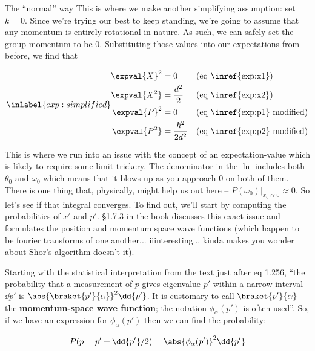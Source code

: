 \begin{answer}
\begin{answerpart}{The ``normal'' way}
    This is where we make another simplifying assumption: set $k = 0$.
    Since we're trying our best to keep \icepick{} standing, we're
    going to assume that any momentum is entirely rotational in
    nature.  As such, we can safely set the group momentum to be 0.
    Substituting those values into our expectations from before, we
    find that

    \begin{equation}
      \inlabel{exp:simplified}
      \begin{alignedat}{2}
        \expval{X}^2 &= 0 & \quad{} &\text{(eq \inref{exp:x1})}\\
        \expval{X^2} &= \frac{d^2}{2} & &\text{(eq \inref{exp:x2})}\\
        \expval{P}^2 &= 0 & &\text{(eq \inref{exp:p1} modified)}\\
        \expval{P^2} &= \frac{\hbar^2}{2d^2} & &\text{(eq \inref{exp:p2} modified)}\\
      \end{alignedat}
    \end{equation}
    
    This is where we run into an issue with the concept of an
    expectation-value which is likely to require some limit trickery.
    The denominator in the $\ln$ includes both $\theta_0$ and
    $\omega_0$ which means that it blows up as you approach 0 on both
    of them.  There is one thing that, physically, might help us out
    here -- $P(\omega_0)|_{x_0 \approx 0} \approx 0$.  So let's see if
    that integral converges.  To find out, we'll start by computing
    the probabilities of $x'$ and $p'$.  \S 1.7.3 in the book
    discusses this exact issue and formulates the position and
    momentum space wave functions (which happen to be fourier
    transforms of one another... iiinteresting... kinda makes you
    wonder about Shor's algorithm doesn't it).

    Starting with the statistical interpretation from the text just
    after eq 1.256, ``the probability that a measurement of $p$ gives
    eigenvalue $p'$ within a narrow interval $\dd{p'}$ is
    $\abs{\braket{p'}{\alpha}}^2\dd{p'}$.  It is customary to call
    $\braket{p'}{\alpha}$ the \textbf{momentum-space wave function};
    the notation $\phi_{\alpha}(p')$ is often used''.  So, if we have
    an expression for $\phi_{\alpha}(p')$ then we can find the
    probability:

    \begin{equation}
      P(p = p' \pm \dd{p'}/2) = \abs{\phi_{\alpha}(p')}^2\dd{p'}
    \end{equation}


\end{answerpart}
\end{answer}
